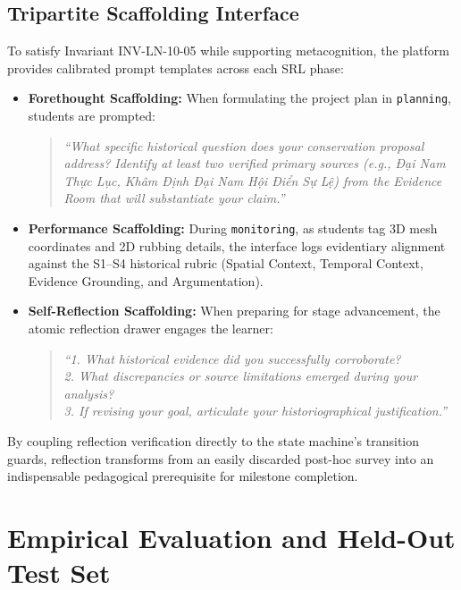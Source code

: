 \documentclass[11pt,a4paper]{article}
\begin{document}
\subsection{Tripartite Scaffolding Interface}
To satisfy Invariant INV-LN-10-05 while supporting metacognition, the platform provides calibrated prompt templates across each SRL phase:
\begin{itemize}
    \item \textbf{Forethought Scaffolding:}
    When formulating the project plan in \texttt{planning}, students are prompted:
    \begin{quote}
    \textit{``What specific historical question does your conservation proposal address? Identify at least two verified primary sources (e.g., Đại Nam Thực Lục, Khâm Định Đại Nam Hội Điển Sự Lệ) from the Evidence Room that will substantiate your claim.''}
    \end{quote}
    \item \textbf{Performance Scaffolding:}
    During \texttt{monitoring}, as students tag 3D mesh coordinates and 2D rubbing details, the interface logs evidentiary alignment against the S1--S4 historical rubric (Spatial Context, Temporal Context, Evidence Grounding, and Argumentation).
    \item \textbf{Self-Reflection Scaffolding:}
    When preparing for stage advancement, the atomic reflection drawer engages the learner:
    \begin{quote}
    \textit{``1. What historical evidence did you successfully corroborate?\\
    2. What discrepancies or source limitations emerged during your analysis?\\
    3. If revising your goal, articulate your historiographical justification.''}
    \end{quote}
\end{itemize}

By coupling reflection verification directly to the state machine's transition guards, reflection transforms from an easily discarded post-hoc survey into an indispensable pedagogical prerequisite for milestone completion.

\section{Empirical Evaluation and Held-Out Test Set}
\end{document}
